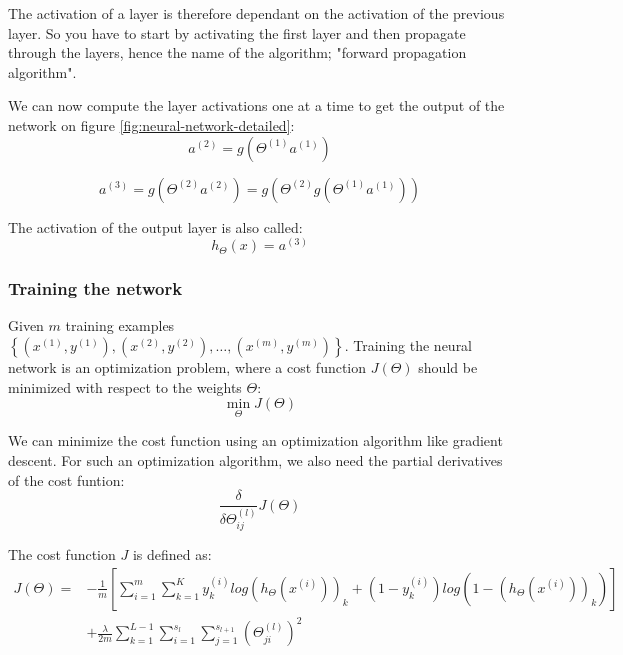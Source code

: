 The activation of a layer is therefore dependant on the activation of the previous layer. So you have to start by activating the first layer and then propagate through the layers, hence the name of the algorithm; "forward propagation algorithm".

We can now compute the layer activations one at a time to get the output of the network on figure \ref{fig:neural-network-detailed}:
\begin{equation}
a^{(2)} = g(\Theta^{(1)}a^{(1)})
\end{equation}

\begin{equation}
a^{(3)} = g(\Theta^{(2)}a^{(2)}) = g(\Theta^{(2)} g(\Theta^{(1)}a^{(1)}))
\end{equation}

The activation of the output layer is also called:
\begin{equation}
h_\Theta(x) = a^{(3)}
\end{equation}

\subsubsection{Training the network}
Given $m$ training examples $\left\{(x^{(1)},y^{(1)}), (x^{(2)},y^{(2)}),\dots, (x^{(m)},y^{(m)}) \right\}$.
Training the neural network is an optimization problem, where a cost function $J(\Theta)$ should be minimized with respect to the weights $\Theta$:
\begin{equation}
\min_{\Theta} J(\Theta)
\end{equation}

We can minimize the cost function using an optimization algorithm like gradient descent. For such an optimization algorithm, we also need the partial derivatives of the cost funtion:
\begin{equation}
\frac{\delta}{\delta\Theta^{(l)}_{ij}}J(\Theta)
\end{equation}

The cost function $J$ is defined as:
\begin{equation}
\begin{split}
J(\Theta) = &-\frac{1}{m}
\left[
\sum^m_{i=1}\sum^K_{k=1}
y_k^{(i)}
log(h_\Theta(x^{(i)}))_k +
(1-y_k^{(i)})
log(1-(h_\Theta(x^{(i)}))_k)
\right] \\
&+ \frac{\lambda}{2m}
\sum^{L-1}_{k=1}
\sum^{s_l}_{i=1}
\sum^{s_{l+1}}_{j=1}
(\Theta^{(l)}_{ji})^2
\end{split}
\end{equation}

